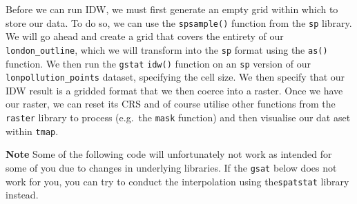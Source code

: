 \documentclass[
]{book}
\newenvironment{Shaded}{\begin{snugshade}}{\end{snugshade}}
\newcommand{\AttributeTok}[1]{\textcolor[rgb]{0.77,0.63,0.00}{#1}}
\newcommand{\CommentTok}[1]{\textcolor[rgb]{0.56,0.35,0.01}{\textit{#1}}}
\newcommand{\DecValTok}[1]{\textcolor[rgb]{0.00,0.00,0.81}{#1}}
\newcommand{\FunctionTok}[1]{\textcolor[rgb]{0.00,0.00,0.00}{#1}}
\newcommand{\NormalTok}[1]{#1}
\newcommand{\OtherTok}[1]{\textcolor[rgb]{0.56,0.35,0.01}{#1}}
\newcommand{\SpecialCharTok}[1]{\textcolor[rgb]{0.00,0.00,0.00}{#1}}
\newcommand{\StringTok}[1]{\textcolor[rgb]{0.31,0.60,0.02}{#1}}
\begin{document}
Before we can run IDW, we must first generate an empty grid within which to store our data. To do so, we can use the \texttt{spsample()} function from the \texttt{sp} library. We will go ahead and create a grid that covers the entirety of our \texttt{london\_outline}, which we will transform into the \texttt{sp} format using the \texttt{as()} function. We then run the \texttt{gstat} \texttt{idw()} function on an \texttt{sp} version of our \texttt{lonpollution\_points} dataset, specifying the cell size. We then specify that our IDW result is a gridded format that we then coerce into a raster. Once we have our raster, we can reset its CRS and of course utilise other functions from the \texttt{raster} library to process (e.g.~the \texttt{mask} function) and then visualise our dat aset within \texttt{tmap}.

\textbf{Note}
Some of the following code will unfortunately not work as intended for some of you due to changes in underlying libraries. If the \texttt{gsat} below does not work for you, you can try to conduct the interpolation using the\texttt{spatstat} library instead.

\begin{Shaded}
\end{Shaded}
\end{document}
